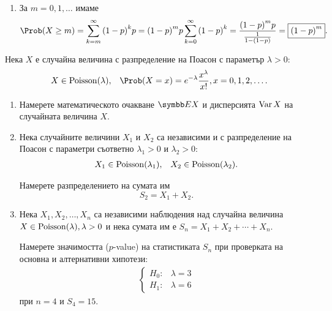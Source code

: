 \documentclass[numbers=endperiod, bibliography=totocnumbered]{scrartcl}
\begin{document}
\begin{solution}
\begin{enumerate}[label=\alph*)]
    \item За \( m = 0, 1, \ldots \) имаме
    \begin{equation*}
      \Prob(X \geq m)
      =
      \sum_{k=m}^\infty {(1-p)}^k p
      =
      {(1-p)}^m p \sum_{k=0}^\infty {(1-p)}^k
      =
      \frac {{(1-p)}^m p} {\frac 1 {1-(1-p)}}
      =
      \boxed{{(1-p)}^m}.
    \end{equation*}
  \end{enumerate}
\end{solution}

\begin{exercise}\label{ex:se_summer2016}
  Нека \( X \) е случайна величина с разпределение на Поасон с параметър \( \lambda > 0 \):
  \begin{align*}
    X \in \DPoisson(\lambda),
    &&
    \Prob(X = x) = e^{-\lambda} \frac {x^\lambda} {x!}, x = 0, 1, 2, \ldots.
  \end{align*}

  \begin{enumerate}[label=\alph*)]
    \item Намерете математическото очакване \( \Expect X \) и дисперсията \( \operatorname{Var} X \) на случайната величина \( X \).
    \item Нека случайните величини \( X_1 \) и \( X_2 \) са независими и с разпределение на Поасон с параметри съответно \( \lambda_1 > 0 \) и \( \lambda_2 > 0 \):
    \begin{align*}
      X_1 \in \operatorname{Poisson}(\lambda_1),
      &&
      X_2 \in \operatorname{Poisson}(\lambda_2).
    \end{align*}

    Намерете разпределението на сумата им
    \begin{equation*}
      S_2 = X_1 + X_2.
    \end{equation*}

    \item Нека \( X_1, X_2, \ldots, X_n \) са независими наблюдения над случайна величина \( X \in \operatorname{Poisson}(\lambda), \lambda > 0 \) и нека сумата им е \( S_n = X_1 + X_2 + \cdots + X_n \).

    Намерете значимостта (\( p \)-value) на статистиката \( S_n \) при проверката на основна и алтернативни хипотези:
    \begin{align*}
      \begin{cases}
        H_0: &\lambda = 3 \\
        H_1: &\lambda = 6
      \end{cases}
    \end{align*}
    при \( n = 4 \) и \( S_4 = 15 \).
  \end{enumerate}
\end{exercise}
\end{document}
